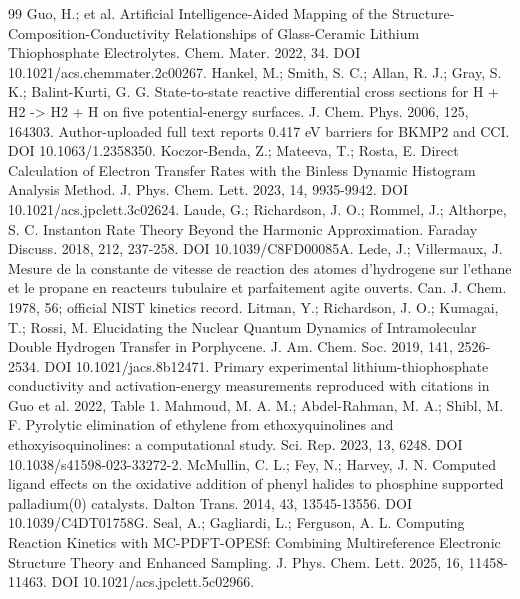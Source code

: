 \begin{thebibliography}{99}
 Guo, H.; et al. Artificial Intelligence-Aided Mapping of the Structure-Composition-Conductivity Relationships of Glass-Ceramic Lithium Thiophosphate Electrolytes. Chem. Mater. 2022, 34. DOI 10.1021/acs.chemmater.2c00267.
 Hankel, M.; Smith, S. C.; Allan, R. J.; Gray, S. K.; Balint-Kurti, G. G. State-to-state reactive differential cross sections for H + H2 -> H2 + H on five potential-energy surfaces. J. Chem. Phys. 2006, 125, 164303. Author-uploaded full text reports 0.417 eV barriers for BKMP2 and CCI. DOI 10.1063/1.2358350.
 Koczor-Benda, Z.; Mateeva, T.; Rosta, E. Direct Calculation of Electron Transfer Rates with the Binless Dynamic Histogram Analysis Method. J. Phys. Chem. Lett. 2023, 14, 9935-9942. DOI 10.1021/acs.jpclett.3c02624.
 Laude, G.; Richardson, J. O.; Rommel, J.; Althorpe, S. C. Instanton Rate Theory Beyond the Harmonic Approximation. Faraday Discuss. 2018, 212, 237-258. DOI 10.1039/C8FD00085A.
 Lede, J.; Villermaux, J. Mesure de la constante de vitesse de reaction des atomes d'hydrogene sur l'ethane et le propane en reacteurs tubulaire et parfaitement agite ouverts. Can. J. Chem. 1978, 56; official NIST kinetics record.
 Litman, Y.; Richardson, J. O.; Kumagai, T.; Rossi, M. Elucidating the Nuclear Quantum Dynamics of Intramolecular Double Hydrogen Transfer in Porphycene. J. Am. Chem. Soc. 2019, 141, 2526-2534. DOI 10.1021/jacs.8b12471.
 Primary experimental lithium-thiophosphate conductivity and activation-energy measurements reproduced with citations in Guo et al. 2022, Table 1.
 Mahmoud, M. A. M.; Abdel-Rahman, M. A.; Shibl, M. F. Pyrolytic elimination of ethylene from ethoxyquinolines and ethoxyisoquinolines: a computational study. Sci. Rep. 2023, 13, 6248. DOI 10.1038/s41598-023-33272-2.
 McMullin, C. L.; Fey, N.; Harvey, J. N. Computed ligand effects on the oxidative addition of phenyl halides to phosphine supported palladium(0) catalysts. Dalton Trans. 2014, 43, 13545-13556. DOI 10.1039/C4DT01758G.
 Seal, A.; Gagliardi, L.; Ferguson, A. L. Computing Reaction Kinetics with MC-PDFT-OPESf: Combining Multireference Electronic Structure Theory and Enhanced Sampling. J. Phys. Chem. Lett. 2025, 16, 11458-11463. DOI 10.1021/acs.jpclett.5c02966.

\end{thebibliography}
